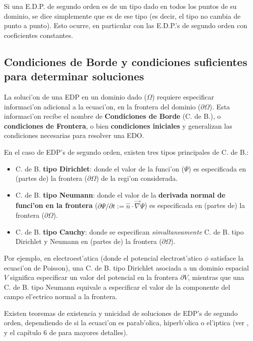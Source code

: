 Si una E.D.P. de segundo orden es de un tipo dado en todos los puntos de su dominio, se dice simplemente que es de ese tipo (es decir, el tipo no cambia de punto a punto). Esto ocurre, en particular con las E.D.P.'s de segundo orden con coeficientes constantes.

\subsection{Condiciones de Borde y condiciones suficientes para determinar soluciones}
La soluci'on de una EDP en un dominio dado ($\Omega$) requiere especificar informaci'on adicional a la ecuaci'on, en la frontera del dominio ($\partial\Omega$). Esta informaci'on recibe el nombre de \textbf{Condiciones de Borde} (C. de B.), o \textbf{condiciones de Frontera}, o bien \textbf{condiciones iniciales} y generalizan las condiciones necesarias para resolver una EDO.

En el caso de EDP's de segundo orden, existen tres tipos principales de C. de B.:

\begin{itemize}
\item C. de B. \textbf{tipo Dirichlet}: donde el valor de la funci'on ($\Psi$) es especificada en (partes de) la frontera ($\partial\Omega$) de la regi'on considerada.
\item C. de B. \textbf{tipo Neumann}: donde el valor de la \textbf{derivada normal de funci'on en la frontera} ($\partial\Psi/\partial t:=\hat{n}\cdot\vec\nabla\Psi$) es especificada en (partes de) la frontera ($\partial\Omega$).
\item C. de B. \textbf{tipo Cauchy}: donde se especifican \textit{simultaneamente} C. de B. tipo Dirichlet y Neumann en (partes de) la frontera ($\partial\Omega$).
\end{itemize}

Por ejemplo, en electroest'atica (donde el potencial electrost'atico $\phi$ satisface la ecuaci'on de Poisson), una C. de B. tipo Dirichlet asociada a un dominio espacial $V$ significa especificar un valor del potencial en la frontera $\partial V$, mientras que una C. de B. tipo Neumann equivale a especificar el valor de la componente del campo el'ectrico normal a la frontera. 

Existen teoremas de existencia y unicidad de soluciones de EDP's de segundo orden, dependiendo de si la ecuaci'on es parab'olica, hiperb'olica o el'iptica (ver \cite{Riley}, y el capítulo 6 de \cite{MF53} para mayores detalles).

